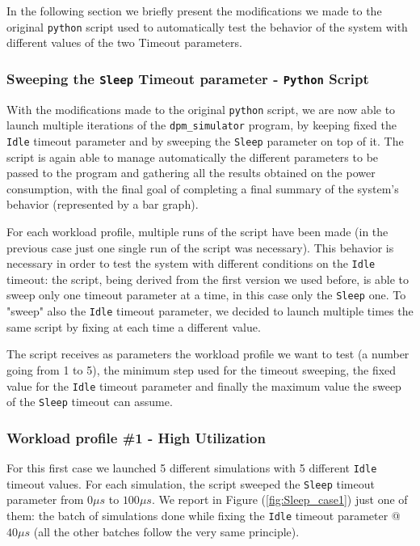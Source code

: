 \documentclass[a4paper]{article}
\begin{document}
            In the following section we briefly present the modifications we made to the original \texttt{python} script used to automatically test the behavior of the system with different values of the two Timeout parameters.

        \subsubsection{Sweeping the \texttt{Sleep} Timeout parameter - \texttt{Python} Script}
            With the modifications made to the original \texttt{python} script, we are now able to launch multiple iterations of the \texttt{dpm\_simulator} program, by keeping fixed the \texttt{Idle} timeout parameter and by sweeping the \texttt{Sleep} parameter on top of it. The script is again able to manage automatically the different parameters to be passed to the program and gathering all the results obtained on the power consumption, with the final goal of completing a final summary of the system's behavior (represented by a bar graph).

            For each workload profile, multiple runs of the script have been made (in the previous case just one single run of the script was necessary). This behavior is necessary in order to test the system with different conditions on the \texttt{Idle} timeout: the script, being derived from the first version we used before, is able to sweep only one timeout parameter at a time, in this case only the \texttt{Sleep} one. To "sweep" also the \texttt{Idle} timeout parameter, we decided to launch multiple times the same script by fixing at each time a different value.

            The script receives as parameters the workload profile we want to test (a number going from 1 to 5), the minimum step used for the timeout sweeping, the fixed value for the \texttt{Idle} timeout parameter and finally the maximum value the sweep of the \texttt{Sleep} timeout can assume.

        \subsubsection{Workload profile \#1 - High Utilization}
            For this first case we launched 5 different simulations with 5 different \texttt{Idle} timeout values. For each simulation, the script sweeped the \texttt{Sleep} timeout parameter from $0 \mu s$ to $100 \mu s$. We report in Figure (\ref{fig:Sleep_case1}) just one of them: the batch of simulations done while fixing the \texttt{Idle} timeout parameter @ $40 \mu s$ (all the other batches follow the very same principle).
\end{document}
